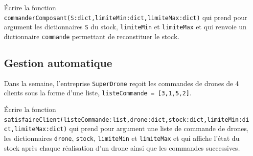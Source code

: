 \begin{question}
\'Ecrire la fonction \lstinline{commanderComposant(S:dict,limiteMin:dict,limiteMax:dict)} qui prend pour argument les dictionnaires \lstinline{S} du stock, \lstinline{limiteMin} et \lstinline{limiteMax} et qui renvoie un dictionnaire \lstinline{commande} permettant de reconstituer le stock.
\end{question}

\subsection*{Gestion automatique}
Dans la semaine, l'entreprise \lstinline{SuperDrone} reçoit les commandes de drones de 4 clients sous la forme d'une liste, \lstinline{listeCommande = [3,1,5,2]}.

\begin{question}
\'Ecrire la fonction \lstinline{satisfaireClient(listeCommande:list,drone:dict,stock:dict,limiteMin:dict,limiteMax:dict)} qui prend pour argument une liste de commande de drones, les dictionnaires \lstinline{drone}, \lstinline{stock}, \lstinline{limiteMin} et \lstinline{limiteMax} et qui affiche l'état du stock après chaque réalisation d'un drone ainsi que les commandes successives.
\end{question}

